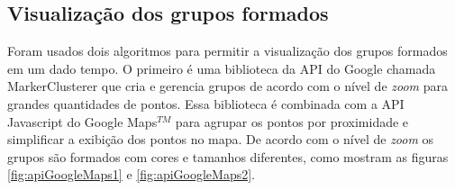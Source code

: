 \subsection{Visualização dos grupos formados}
Foram usados dois algoritmos para permitir a visualização dos grupos formados em um dado tempo.
O primeiro é uma biblioteca da API do Google chamada MarkerClusterer \cite{markerCluster} que cria e gerencia grupos de acordo com o nível de \textit{zoom} para grandes quantidades de pontos.
Essa biblioteca é combinada com a API Javascript do Google Maps$^{TM}$ para agrupar os pontos por proximidade e simplificar a exibição dos pontos no mapa.
De acordo com o nível de \textit{zoom} os grupos são formados com cores e tamanhos diferentes, como mostram as figuras \ref{fig:apiGoogleMaps1} e \ref{fig:apiGoogleMaps2}.
\begin{figure}[!ht]
	\centering	
\end{figure}
\FloatBarrier

\begin{figure}[!ht]
	\centering	
\end{figure}
\FloatBarrier

